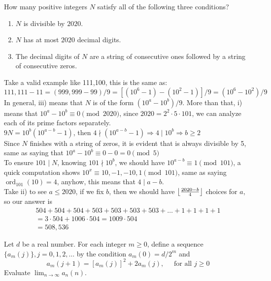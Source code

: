 \begin{problem}[N][6][Putnam 2020-A1]
    How many positive integers \( N \) satisfy all of the following three conditions?
    \begin{enumerate}[label=(\roman*), topsep=1mm]
        \item \( N \) is divisible by \( 2020 \).
        \item \( N \) has at most \( 2020 \) decimal digits.
        \item The decimal digits of \( N \) are a string of consecutive ones followed by a string of consecutive zeros.
    \end{enumerate}%
\end{problem}

\begin{solution}[508,536]
    Take a valid example like 111,100, this is the same as:\\
    $111,111-11=(999,999-99)/9=\left[(10^6-1)-(10^2-1)\right]/9=(10^6-10^2)/9$\\
    In general, iii) means that $N$ is of the form $(10^a-10^b)/9$. More than that, i) means that $10^a-10^b \equiv 0 \pmod{2020}$, since $2020=2^2 \cdot 5 \cdot 101$, we can analyze each of its prime factors separately.\\
    $9N=10^b(10^{a-b}-1)$, then $4 \nmid (10^{a-b}-1) \Rightarrow 4\mid 10^b \Rightarrow b\geq 2$\\ 
    Since $N$ finishes with a string of zeros, it is evident that is always divisible by 5, same as saying that $10^a-10^b\equiv0-0=0 \pmod 5$\\
    To ensure $101 \mid N$, knowing $101 \nmid 10^b$, we should have $10^{a-b} \equiv 1 \pmod{101}$, a quick computation shows $10^x \equiv 10,-1,-10,1 \pmod{101}$, same as saying $\operatorname{ord}_{101}(10) = 4$, anyhow, this means that $4 \mid a-b$.\\
    Take ii) to see $a\leq 2020$, if we fix $b$, then we should have $\myFloor[4]{2020-b}$ choices for $a$, so our answer is
    \begin{align*}
    504+504+504+503+503+503+503+\ldots+1+1+1+1\\
    =3\cdot504 +1006\cdot504=1009\cdot504\\
    =\boxed{508,536}
    \end{align*}
\end{solution}

\begin{problem}[A][6][Putnam 1985]
     Let $d$ be a real number. For each integer $m \geq 0$, define a sequence $\{a_m(j)\},j=0,1,2,\ldots$ by the condition $a_m(0)=d/2^m$ and
    $$ a_m(j+1) = [a_m(j)]^2 + 2a_m(j) \text{,}\hspace{15pt} \text{ for all }  j\geq0 $$
    Evaluate $ \lim_ {n \rightarrow \infty} a_n(n)$.%
\end{problem}

